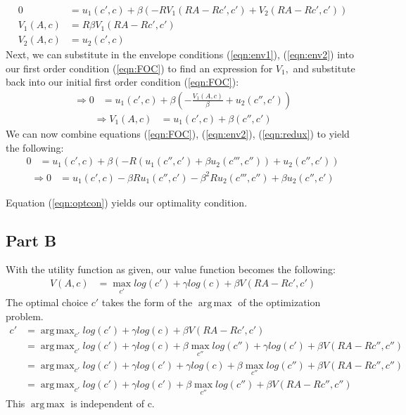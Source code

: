 \documentclass[11pt]{article} %
\DeclareMathOperator*{\argmax}{arg\,max}
\begin{document}
\begin{align}
0&= u_1(c',c) + \beta (-RV_1(RA-Rc',c') + V_2(RA-Rc',c')) \label{eqn:FOC} \\
V_1(A,c) &= R\beta V_1(RA-Rc',c') \label{eqn:env1} \\
V_2(A,c) &= u_2(c',c) \label{eqn:env2}
\end{align}
Next, we can substitute in the envelope conditions (\ref{eqn:env1}), (\ref{eqn:env2}) into our first order condition (\ref{eqn:FOC}) to find an expression for $V_1,$ and substitute back into our initial first order condition (\ref{eqn:FOC}):
\begin{align*}
\Rightarrow 0 &= u_1(c',c) + \beta \left( -\frac{V_1(A,c)}{\beta} + u_2(c'',c')\right)
\end{align*}
\begin{align}
\Rightarrow V_1(A,c) &= u_1(c',c) + \beta(c'',c') \label{eqn:redux}
\end{align}
We can now combine equations (\ref{eqn:FOC}), (\ref{eqn:env2}), (\ref{eqn:redux}) to yield the following:
\begin{align*}
 0&= u_1(c',c) + \beta(-R(u_1(c'',c') + \beta u_2(c''',c'')) + u_2(c'',c'))
\end{align*}
\begin{align}
\Rightarrow 0&= u_1(c',c) - \beta R u_1(c'',c') - \beta^2 R u_2(c''',c'') + \beta u_2(c'',c') \label{eqn:optcon}
\end{align}

Equation (\ref{eqn:optcon}) yields our optimality condition.

\subsection{Part B}
With the utility function as given, our value function becomes the following:
\begin{align*}
V(A,c) &= \max_{c'} log(c') + \gamma log(c) + \beta V(RA-Rc',c')
\end{align*}
The optimal choice $c'$ takes the form of the $\argmax$ of the optimization problem. 
\begin{align*}
c' &= \argmax_{c'}  log(c') + \gamma log(c) + \beta V(RA-Rc',c')\\
&=  \argmax_{c'}  log(c') + \gamma log(c) + \beta \max_{c''} log(c'') + \gamma log(c') + \beta V(RA-Rc'',c'') \\ %
&=  \argmax_{c'}  log(c') + \gamma log(c') + \gamma log(c) + \beta \max_{c''} log(c'')  + \beta V(RA-Rc'',c'') \\
&=  \argmax_{c'}  log(c') + \gamma log(c') + \beta \max_{c''} log(c'')  + \beta V(RA-Rc'',c'') 
\end{align*}
 This $\argmax$ is independent of c. 
\end{document}
